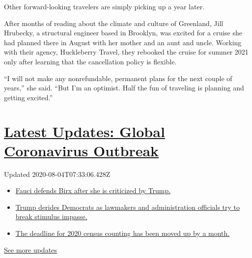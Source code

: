 Other forward-looking travelers are simply picking up a year later.

After months of reading about the climate and culture of Greenland, Jill
Hrubecky, a structural engineer based in Brooklyn, was excited for a
cruise she had planned there in August with her mother and an aunt and
uncle. Working with their agency, Huckleberry Travel, they rebooked the
cruise for summer 2021 only after learning that the cancellation policy
is flexible.

``I will not make any nonrefundable, permanent plans for the next couple
of years,'' she said. ``But I'm an optimist. Half the fun of traveling
is planning and getting excited.''

\hypertarget{latest-updates-global-coronavirus-outbreak}{%
\section{\texorpdfstring{\href{https://www.nytimes3xbfgragh.onion/2020/08/03/world/coronavirus-covid-19.html?action=click\&pgtype=Article\&state=default\&region=MAIN_CONTENT_1\&context=storylines_live_updates}{Latest
Updates: Global Coronavirus
Outbreak}}{Latest Updates: Global Coronavirus Outbreak}}\label{latest-updates-global-coronavirus-outbreak}}

Updated 2020-08-04T07:33:06.428Z

\begin{itemize}
\tightlist
\item
  \href{https://www.nytimes3xbfgragh.onion/2020/08/03/world/coronavirus-covid-19.html?action=click\&pgtype=Article\&state=default\&region=MAIN_CONTENT_1\&context=storylines_live_updates\#link-4547638f}{Fauci
  defends Birx after she is criticized by Trump.}
\item
  \href{https://www.nytimes3xbfgragh.onion/2020/08/03/world/coronavirus-covid-19.html?action=click\&pgtype=Article\&state=default\&region=MAIN_CONTENT_1\&context=storylines_live_updates\#link-15e7f995}{Trump
  derides Democrats as lawmakers and administration officials try to
  break stimulus impasse.}
\item
  \href{https://www.nytimes3xbfgragh.onion/2020/08/03/world/coronavirus-covid-19.html?action=click\&pgtype=Article\&state=default\&region=MAIN_CONTENT_1\&context=storylines_live_updates\#link-e5a2cda}{The
  deadline for 2020 census counting has been moved up by a month.}
\end{itemize}

\href{https://www.nytimes3xbfgragh.onion/2020/08/03/world/coronavirus-covid-19.html?action=click\&pgtype=Article\&state=default\&region=MAIN_CONTENT_1\&context=storylines_live_updates}{See
more updates}

